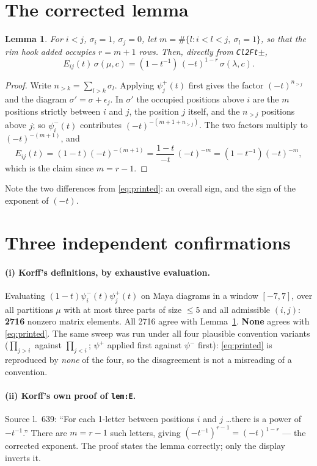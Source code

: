 \documentclass[11pt]{article}
\newtheorem{lemma}[theorem]{Lemma}
\theoremstyle{remark}
\begin{document}
\section{The corrected lemma}

\begin{lemma}\label{lem:corrected}
For $i<j$, $\sigma_i=1$, $\sigma_j=0$, let $m=\#\{l:i<l<j,\ \sigma_l=1\}$, so that the rim hook
added occupies $r=m+1$ rows.  Then, directly from \textnormal{\texttt{Cl2Ft}$\pm$},
\[
   E_{ij}(t)\,\sigma(\mu,c)=(1-t^{-1})\,(-t)^{1-r}\,\sigma(\lambda,c).
\]
\end{lemma}

\begin{proof}
Write $n_{>k}=\sum_{l>k}\sigma_l$.  Applying $\psi^+_j(t)$ first gives the factor
$(-t)^{n_{>j}}$ and the diagram $\sigma'=\sigma+\epsilon_j$.  In $\sigma'$ the occupied
positions above $i$ are the $m$ positions strictly between $i$ and $j$, the position $j$
itself, and the $n_{>j}$ positions above $j$; so $\psi^-_i(t)$ contributes
$(-t)^{-(m+1+n_{>j})}$.  The two factors multiply to $(-t)^{-(m+1)}$, and
\[
   E_{ij}(t)=(1-t)(-t)^{-(m+1)}=\frac{1-t}{-t}\,(-t)^{-m}=(1-t^{-1})(-t)^{-m},
\]
which is the claim since $m=r-1$.
\end{proof}

Note the two differences from \eqref{eq:printed}: an overall sign, and the sign of the exponent
of $(-t)$.

\section{Three independent confirmations}

\paragraph{(i) Korff's definitions, by exhaustive evaluation.}  Evaluating
$(1-t)\psi^-_i(t)\psi^+_j(t)$ on Maya diagrams in a window $[-7,7]$, over all partitions
$\mu$ with at most three parts of size $\le5$ and all admissible $(i,j)$: \textbf{2716} nonzero
matrix elements.  All 2716 agree with Lemma~\ref{lem:corrected}.  \textbf{None} agrees with
\eqref{eq:printed}.  The same sweep was run under all four plausible convention variants
($\prod_{j>i}$ against $\prod_{j<i}$; $\psi^+$ applied first against $\psi^-$ first):
\eqref{eq:printed} is reproduced by \emph{none} of the four, so the disagreement is not a
misreading of a convention.

\paragraph{(ii) Korff's own proof of \texttt{lem:E}.}  Source l.~639: ``For each 1-letter
between positions $i$ and $j$ \dots there is a power of $-t^{-1}$.''  There are $m=r-1$ such
letters, giving $(-t^{-1})^{r-1}=(-t)^{1-r}$ --- the corrected exponent.  The proof states the
lemma correctly; only the display inverts it.
\end{document}
